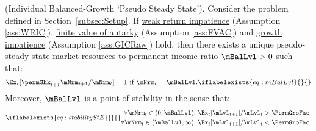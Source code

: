   \begin{theorem}(Individual Balanced-Growth `Pseudo Steady State').
    Consider the problem defined in Section~\ref{subsec:Setup}. If \hyperlink{WRIC}{weak return impatience} (Assumption \ref{ass:WRIC}), \hyperlink{FVAC}{finite value of autarky} (Assumption \ref{ass:FVAC}) and \hyperlink{GICRaw}{growth impatience} (Assumption \ref{ass:GICRaw}) hold, then there exists a unique pseudo-steady-state market resources to permanent income ratio $\mBalLvl>0$ such that:
    \begin{equation}
      \Ex_t [\permShk_{t+1}{\mNrm}_{t+1}/\mNrm_t] = 1 \mbox{~if~} \mNrm_t = \mBalLvl.
      \iflabelexists{eq:mBalLvl}{}{\label{eq:mBalLvl}} %
    \end{equation}
    Moreover, $\mBalLvl$ is a point of stability in the sense that:
    \begin{equation}
      \iflabelexists{eq:stabilityStE}{}{\label{eq:stabilityStE}} %
      \begin{split}
        \forall {\mNrm}_t\in(0,\mBalLvl),      \,\,& \Ex_{t}[\mLvl_{t+1}]/\mLvl_{t} > \PermGroFac \\
        \forall {\mNrm}_t\in(\mBalLvl,\infty), \,\,& \Ex_{t}[\mLvl_{t+1}]/\mLvl_{t} < \PermGroFac.
      \end{split}
    \end{equation}
  \end{theorem}
